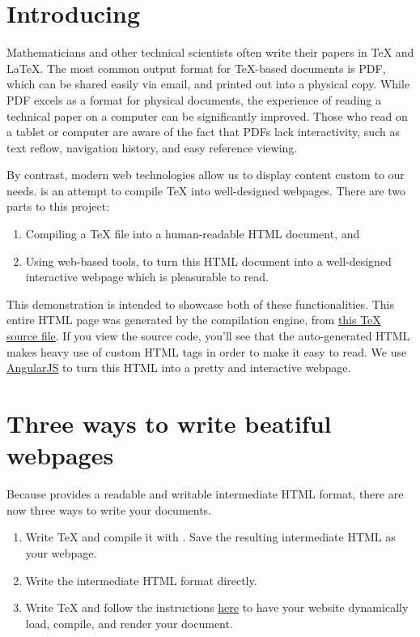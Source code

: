 \documentclass[11pt]{article}
\begin{document}
\section{Introducing \DiscoTeX}
Mathematicians and other technical scientists often write their papers in \TeX{} and \LaTeX.
The most common output format for \TeX{}-based documents is PDF, which can be shared easily via email, and printed out into a physical copy.
While PDF excels as a format for physical documents, the experience of reading a technical paper on a computer can be significantly improved.
Those who read on a tablet or computer are aware of the fact that PDFs lack interactivity, such as text reflow, navigation history, and easy reference viewing.

By contrast, modern web technologies allow us to display content custom to our needs.
\DiscoTeX{} is an attempt to compile \TeX{} into well-designed webpages.
There are two parts to this project:
\begin{enumerate}
    \item Compiling a \TeX{} file into a human-readable HTML document, and
    \item Using web-based tools, to turn this HTML document into a well-designed interactive webpage which is pleasurable to read.
\end{enumerate}
This demonstration is intended to showcase both of these functionalities.
This entire HTML page was generated by the \DiscoTeX{} compilation engine, from \href{demo.tex}{this \TeX{} source file}.
If you view the source code, you'll see that the auto-generated HTML makes heavy use of custom HTML tags in order to make it easy to read.
We use \href{https://angularjs.org/}{AngularJS} to turn this HTML into a pretty and interactive webpage.

\section{Three ways to write beatiful webpages}
Because \DiscoTeX{} provides a readable and writable intermediate HTML format, there are now three ways to write your documents.
\begin{enumerate}
    \item Write \TeX{} and compile it with \DiscoTeX{}. Save the resulting intermediate HTML as your webpage.
    \item Write the intermediate HTML format directly.
    \item Write \TeX{} and follow the instructions \href{??}{here} to have your website dynamically load, compile, and render your document.
\end{enumerate}
\end{document}
